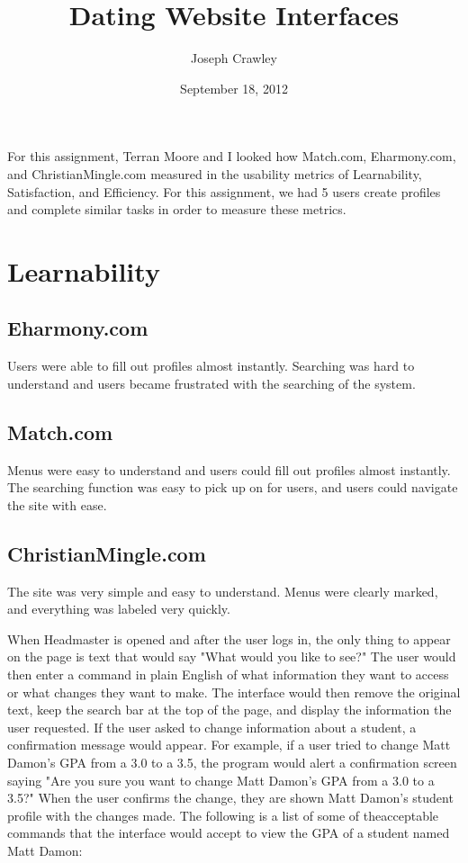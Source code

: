 \documentclass{article}
\title{Dating Website Interfaces}
\author{Joseph Crawley}
\date{September 18, 2012}
\begin{document}
\maketitle

\abstract{}
For this assignment, Terran Moore and I looked how Match.com, Eharmony.com, and ChristianMingle.com measured in the usability metrics of Learnability, Satisfaction, and Efficiency. For this assignment, we had 5 users create profiles and complete similar tasks in order to measure these metrics.  

\pagebreak
\tableofcontents





\pagebreak

%
%
\section{Learnability}
\label{Learnability}

\subsection{Eharmony.com}
Users were able to fill out profiles almost instantly. Searching was hard to understand and users became frustrated with the searching of the system.

\subsection{Match.com}
Menus were easy to understand and users could fill out profiles almost instantly. The searching function was easy to pick up on for users, and users could navigate the site with ease.

\subsection{ChristianMingle.com}
The site was very simple and easy to understand. Menus were clearly marked, and everything was labeled very quickly.

When Headmaster is opened and after the user logs in, the only thing to appear on the page is text that would say "What would you like to see?" The user would then enter a command in plain English of what information they want to access or what changes they want to make. The interface would then remove the original text, keep the search bar at the top of the page, and display the information the user requested. If the user asked to change information about a student, a confirmation message would appear. For example, if a user tried to change Matt Damon's GPA from a 3.0 to a 3.5, the program would alert a confirmation screen saying "Are you sure you want to change Matt Damon's GPA from a 3.0 to a 3.5?" When the user confirms the change, they are shown Matt Damon's student profile with the changes made. The following is a list of some of theacceptable commands that the interface would accept to view the GPA of a student named Matt Damon:
\end{document}

